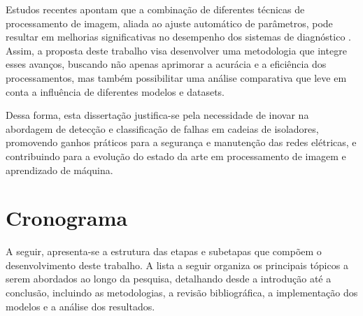 Estudos recentes apontam que a combinação de diferentes técnicas de processamento de imagem, aliada ao ajuste automático de parâmetros, pode resultar em melhorias significativas no desempenho dos sistemas de diagnóstico \cite{Li2019}. Assim, a proposta deste trabalho visa desenvolver uma metodologia que integre esses avanços, buscando não apenas aprimorar a acurácia e a eficiência dos processamentos, mas também possibilitar uma análise comparativa que leve em conta a influência de diferentes modelos e datasets.

Dessa forma, esta dissertação justifica-se pela necessidade de inovar na abordagem de detecção e classificação de falhas em cadeias de isoladores, promovendo ganhos práticos para a segurança e manutenção das redes elétricas, e contribuindo para a evolução do estado da arte em processamento de imagem e aprendizado de máquina.

\section{Cronograma}

A seguir, apresenta-se a estrutura das etapas e subetapas que compõem o desenvolvimento deste trabalho. A lista a seguir organiza os principais tópicos a serem abordados ao longo da pesquisa, detalhando desde a introdução até a conclusão, incluindo as metodologias, a revisão bibliográfica, a implementação dos modelos e a análise dos resultados.


